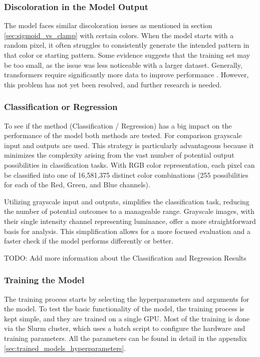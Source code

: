     \subsubsection{Discoloration in the Model Output}
    
    The model faces similar discoloration issues as mentioned in section \autoref{sec:sigmoid_vs_clamp} with certain colors. When the model starts with a random pixel, it often struggles to consistently generate the intended pattern in that color or starting pattern. Some evidence suggests that the training set may be too small, as the issue was less noticeable with a larger dataset. Generally, transformers require significantly more data to improve performance \autocite{chen2022dearkd}. However, this problem has not yet been resolved, and further research is needed.

    \subsubsection{Classification or Regression}
    \label{sec:ClassificationOrRegression}

    To see if the method (Classification / Regression) has a big impact on the performance of the model both methods are tested. For comparison grayscale input and outputs are used. This strategy is particularly advantageous because it minimizes the complexity arising from the vast number of potential output possibilities in classification tasks. With RGB color representation, each pixel can be classified into one of 16,581,375 distinct color combinations (255 possibilities for each of the Red, Green, and Blue channels).

    Utilizing grayscale input and outputs, simplifies the classification task, reducing the number of potential outcomes to a manageable range. Grayscale images, with their single intensity channel representing luminance, offer a more straightforward basis for analysis. This simplification allows for a more focused evaluation and a faster check if the model performs differently or better.

    TODO: Add more information about the Classification and Regression Results
        

    \subsubsection{Training the Model}

    The training process starts by selecting the hyperparameters and arguments for the model. To test the basic functionality of the model, the training process is kept simple, and they are trained on a single GPU. Most of the training is done via the Slurm cluster, which uses a batch script to configure the hardware and training parameters. All the parameters can be found in detail in the appendix \autoref{sec:trained_models_hyperparameters}.
    
